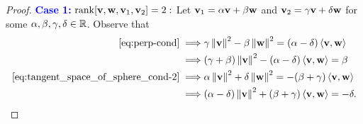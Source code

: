 \begin{proof}
    \vspace{0.3cm}
	\noindent \textcolor{blue}{\textbf{Case 1:}} $\operatorname{rank} [\mathbf{v},\mathbf{w},\mathbf{v}_1,\mathbf{v}_2]=2:$ Let $\mathbf{v}_1=\alpha \mathbf{v}+\beta\mathbf{w}$ and $\mathbf{v}_2=\gamma\mathbf{v}+\delta\mathbf{w}$ for some $\alpha,\beta,\gamma,\delta\in \mathbb{R}$. Observe that 
	\begin{align}
		\eqref{eq:perp-cond} \implies & \gamma \left\|\mathbf{v}\right\|^2-\beta \left\|\mathbf{w}\right\|^2= (\alpha-\delta) \left\langle \mathbf{v},\mathbf{w} \right\rangle 
		\nonumber \\
		\implies & (\gamma+\beta) \left\|\mathbf{v}\right\|^2-(\alpha-\delta)\left\langle \mathbf{v},\mathbf{w} \right\rangle = \beta \label{eq:rk-2_cond-1}
		\\
		\eqref{eq:tangent_space_of_sphere_cond-2} \implies & \alpha \left\|\mathbf{v}\right\|^2+\delta \left\|\mathbf{w}\right\|^2=-(\beta+\gamma)\left\langle \mathbf{v},\mathbf{w} \right\rangle \nonumber 
		\\
		\implies & (\alpha-\delta)\left\|\mathbf{v}\right\|^2+(\beta+\gamma)\left\langle \mathbf{v},\mathbf{w} \right\rangle = -\delta \label{eq:rk-2_cond-2}.
	\end{align}


\end{proof}
